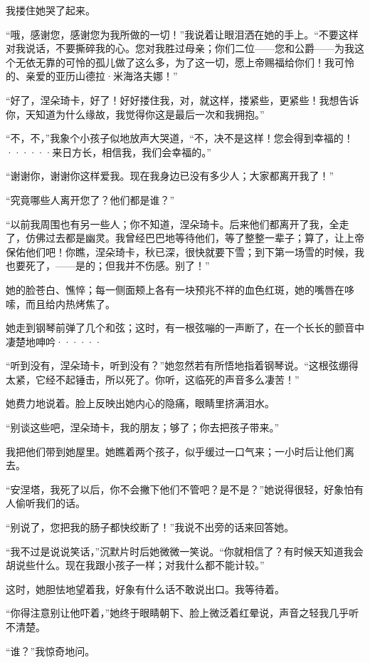 \documentclass[12pt, UTF8]{ctexbook}
\begin{document}
\par 我搂住她哭了起来。
\par “哦，感谢您，感谢您为我所做的一切！”我说着让眼泪洒在她的手上。“不要这样对我说话，不要撕碎我的心。您对我胜过母亲；你们二位——您和公爵——为我这个无依无靠的可怜的孤儿做了这么多，为了这一切，愿上帝赐福给你们！我可怜的、亲爱的亚历山德拉·米海洛夫娜！”
\par “好了，涅朵琦卡，好了！好好搂住我，对，就这样，搂紧些，更紧些！我想告诉你，天知道为什么缘故，我觉得你这是最后一次和我拥抱。”
\par “不，不，”我象个小孩子似地放声大哭道，“不，决不是这样！您会得到幸福的！······来日方长，相信我，我们会幸福的。”
\par “谢谢你，谢谢你这样爱我。现在我身边已没有多少人；大家都离开我了！”
\par “究竟哪些人离开您了？他们都是谁？”
\par “以前我周围也有另一些人；你不知道，涅朵琦卡。后来他们都离开了我，全走了，仿佛过去都是幽灵。我曾经巴巴地等待他们，等了整整一辈子；算了，让上帝保佑他们吧！你瞧，涅朵琦卡，秋已深，很快就要下雪；到下第一场雪的时候，我也要死了，——是的；但我并不伤感。别了！”
\par 她的脸苍白、憔悴；每一侧面颊上各有一块预兆不祥的血色红斑，她的嘴唇在哆嗦，而且给内热烤焦了。
\par 她走到钢琴前弹了几个和弦；这时，有一根弦嘣的一声断了，在一个长长的颤音中凄楚地呻吟······
\par “听到没有，涅朵琦卡，听到没有？”她忽然若有所悟地指着钢琴说。“这根弦绷得太紧，它经不起锤击，所以死了。你听，这临死的声音多么凄苦！”
\par 她费力地说着。脸上反映出她内心的隐痛，眼睛里挤满泪水。
\par “别谈这些吧，涅朵琦卡，我的朋友；够了；你去把孩子带来。”
\par 我把他们带到她屋里。她瞧着两个孩子，似乎缓过一口气来；一小时后让他们离去。
\par “安涅塔，我死了以后，你不会撇下他们不管吧？是不是？”她说得很轻，好象怕有人偷听我们的话。
\par “别说了，您把我的肠子都快绞断了！”我说不出旁的话来回答她。
\par “我不过是说说笑话，”沉默片时后她微微一笑说。“你就相信了？有时候天知道我会胡说些什么。现在我跟小孩子一样；对我什么都不能计较。”
\par 这时，她胆怯地望着我，好象有什么话不敢说出口。我等待着。
\par “你得注意别让他吓着，”她终于眼睛朝下、脸上微泛着红晕说，声音之轻我几乎听不清楚。
\par “谁？”我惊奇地问。
\end{document}
